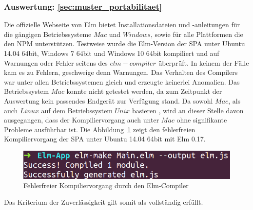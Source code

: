\subsubsection{Auswertung: \ref{sec:muster_portabilitaet} }
Die offizielle Webseite von Elm bietet Installationsdateien und -anleitungen für die gängigen Betriebssysteme $Mac$ und $Windows$, sowie für alle Plattformen die den \ac{NPM} unterstützen. Testweise wurde die Elm-Version der \ac{SPA} unter Ubuntu 14.04 64bit, Windows 7 64bit und Windows 10 64bit kompiliert und auf Warnungen oder Fehler seitens des $elm-compiler$ überprüft. In keinem der Fälle kam es zu Fehlern, geschweige denn Warnungen. Das Verhalten des Compilers war unter allen Betriebssystemen gleich und erzeugte keinerlei Anomalien. Das Betriebssystem $Mac$ konnte nicht getestet werden, da zum Zeitpunkt der Auswertung kein passendes Endgerät zur Verfügung stand. Da sowohl $Mac$, als auch $Linux$ auf dem Betriebssystem $Unix$ basieren \cite{http://www.itwissen.info/definition/lexikon/UNIX.html}, wird an dieser Stelle davon ausgegangen, dass der Kompiliervorgang auch unter $Mac$ ohne signifikante Probleme ausführbar ist. Die Abbildung~\ref{fig:elm-compile} zeigt den fehlerfreien Kompiliervorgang der \ac{SPA} unter Ubuntu 14.04 64bit mit Elm 0.17.
\begin{figure}[h]
\centering
\includegraphics[scale=0.5]{img/elm-compile.png}
\caption{Fehlerfreier Kompiliervorgang durch den Elm-Compiler}\label{fig:elm-compile}
\end{figure}
Das Kriterium der Zuverlässigkeit gilt somit als vollständig erfüllt.


